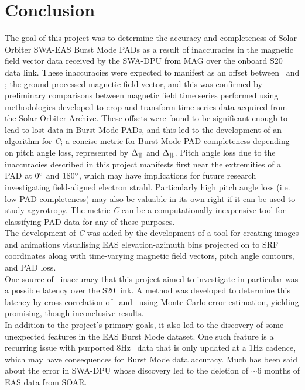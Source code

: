 \chapter{Conclusion}
\label{chapterlabel4}
The goal of this project was to determine the accuracy and completeness of Solar Orbiter SWA-EAS Burst Mode PADs as a result of inaccuracies in \Beas\; the magnetic field vector data received by the SWA-DPU from MAG over the onboard S20 data link. These inaccuracies were expected to manifest as an offset between \Beas\ and \Bmag; the ground-processed magnetic field vector, and this was confirmed by preliminary comparisons between magnetic field time series performed using methodologies developed to crop and transform time series data acquired from the Solar Orbiter Archive. These offsets were found to be significant enough to lead to lost data in Burst Mode PADs, and this led to the development of an algorithm for \textit{C}; a concise metric for Burst Mode PAD completeness depending on pitch angle loss, represented by \(\Delta_{\upharpoonleft \! \upharpoonright}\) and \(\Delta_{\upharpoonleft \! \downharpoonright}\). Pitch angle loss due to the inaccuracies described in this project manifests first near the extremities of a PAD at \(0\degree\) and \(180\degree\), which may have implications for future research investigating field-aligned electron strahl. Particularly high pitch angle loss (i.e. low PAD completeness) may also be valuable in its own right if it can be used to study agyrotropy. The metric \textit{C} can be a computationally inexpensive tool for classifying PAD data for any of these purposes.
\\

The development of \textit{C} was aided by the development of a tool for creating images and animations visualising EAS elevation-azimuth bins projected on to SRF coordinates along with time-varying magnetic field vectors, pitch angle contours, and PAD loss.
\\

One source of \Beas\ inaccuracy that this project aimed to investigate in particular was a possible latency over the S20 link. A method was developed to determine this latency by cross-correlation of \Beas\ and \Bmag\ using Monte Carlo error estimation, yielding promising, though inconclusive results.
\\

In addition to the project's primary goals, it also led to the discovery of some unexpected features in the EAS Burst Mode dataset. One such feature is a recurring issue with purported 8Hz \Beas\ data that is only updated at a 1Hz cadence, which may have consequences for Burst Mode data accuracy. Much has been said about the error in SWA-DPU whose discovery led to the deletion of \(\sim6\) months of EAS data from SOAR.
\\

